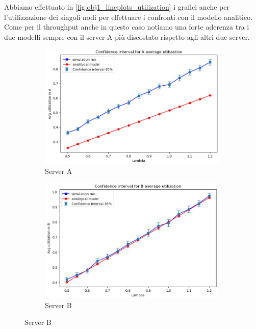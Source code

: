 Abbiamo effettuato in \autoref{fig:obj1_lineplots_utilization} i grafici anche per l'utilizzazione dei singoli nodi per effettuare i confronti con il modello analitico.\\
Come per il throughput anche in questo caso notiamo una forte aderenza tra i due modelli sempre con il server A più discostato rispetto agli altri due server.
\begin{figure}
    \centering
    \begin{subfigure}{0.49\linewidth}
        \centering
        \includegraphics[width=\columnwidth]{figs/results/obj1/obj1-line-utilization-A.png}
        \caption{Server A}
        \label{fig:obj1_line_utilization_A}
    \end{subfigure} 
    \begin{subfigure}{0.49\linewidth}
        \centering
         \includegraphics[width=\columnwidth]{figs/results/obj1/obj1-line-utilization-B.png}
        \caption{Server B}

\end{subfigure}
\end{figure}
